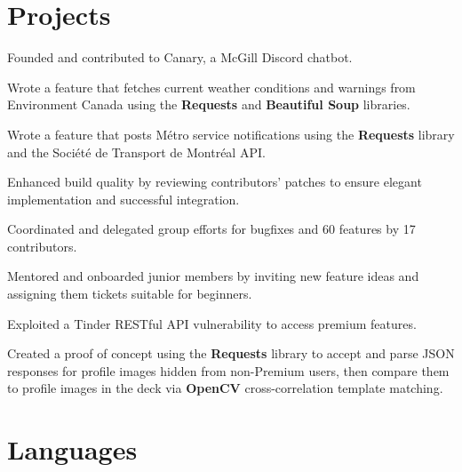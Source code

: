 \documentclass[]{jidicula-resume}
\begin{document}
\newpage
\section{Projects}

\begin{tightemize}
\item Founded and contributed to Canary, a McGill Discord chatbot.
  \item Wrote a feature that fetches current weather conditions and warnings from Environment Canada using the \textbf{Requests} and \textbf{Beautiful Soup} libraries.
  \item Wrote a feature that posts M\'etro service notifications using the \textbf{Requests} library and the Soci\'et\'e de Transport de Montr\'eal API.
  \item Enhanced build quality by reviewing contributors' patches to ensure elegant implementation and successful integration.
  \item Coordinated and delegated group efforts for bugfixes and 60 features by 17 contributors.
  \item Mentored and onboarded junior members by inviting new feature ideas and assigning them tickets suitable for beginners.
\end{tightemize}
\sectionsep

\begin{tightemize}
\item Exploited a Tinder RESTful API vulnerability to access premium features.
\item Created a proof of concept using the \textbf{Requests} library to accept and parse JSON responses for profile images hidden from non-Premium users, then compare them to profile images in the deck via \textbf{OpenCV} cross-correlation template matching.
\end{tightemize}
\sectionsep

\section{Languages}
\end{document}
